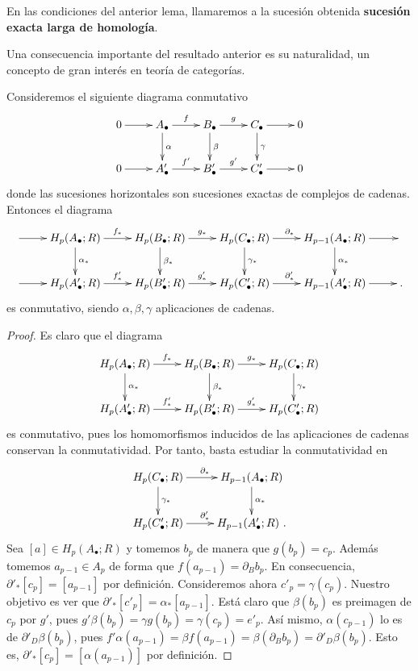 \begin{definicion}
	En las condiciones del anterior lema, llamaremos a la sucesión obtenida \textbf{sucesión exacta larga de homología}.
\end{definicion}
Una consecuencia importante del resultado anterior es su naturalidad, un concepto de gran interés en teoría de categorías.
\begin{teorema}
	Consideremos el siguiente diagrama conmutativo
	\[
	\xymatrix{
		0 \ar@{->}[r] & A_{\bullet} \ar@{->}[r]^{f} \ar@{->}[d]^{\alpha} & B_{\bullet} \ar@{->}[r]^{g} \ar@{->}[d]^{\beta} & C_{\bullet} \ar@{->}[r] \ar@{->}[d]^{\gamma} & 0 \\
		0 \ar@{->}[r] & A'_{\bullet} \ar@{->}[r]^{f'} & B'_{\bullet} \ar@{->}[r]^{g'} & C'_{\bullet} \ar@{->}[r] & 0
	}
	\]
	donde las sucesiones horizontales son sucesiones exactas de complejos de cadenas. Entonces el diagrama
	\[
	\xymatrix{
		{} \ar@{->}[r] & H_p(A_{\bullet};R) \ar@{->}[r]^{f_*} \ar@{->}[d]^{\alpha_*} & H_p(B_{\bullet};R) \ar@{->}[r]^{g_*} \ar@{->}[d]^{\beta_*} & H_p(C_{\bullet};R) \ar@{->}[r]^{\partial_*} \ar@{->}[d]^{\gamma_*} & H_{p-1}(A_{\bullet};R) \ar@{->}[r] \ar@{->}[d]^{\alpha_*} & {} \\
		{} \ar@{->}[r] & H_p(A'_{\bullet};R) \ar@{->}[r]^{f'_*} & H_p(B'_{\bullet};R) \ar@{->}[r]^{g'_*} & H_p(C'_{\bullet};R) \ar@{->}[r]^{\partial'_*} & H_{p-1}(A'_{\bullet};R) \ar@{->}[r] & .
	}
	\]
	es conmutativo, siendo $\alpha, \beta, \gamma$ aplicaciones de cadenas.
\end{teorema}
\begin{proof}
	Es claro que el diagrama
	\[
	\xymatrix{
		H_p(A_{\bullet};R) \ar@{->}[r]^{f_*} \ar@{->}[d]^{\alpha_*} & H_p(B_{\bullet};R) \ar@{->}[r]^{g_*} \ar@{->}[d]^{\beta_*} & H_p(C_{\bullet};R) \ar@{->}[d]^{\gamma_*} \\
		H_p(A'_{\bullet};R) \ar@{->}[r]^{f'_*} & H_p(B'_{\bullet};R) \ar@{->}[r]^{g'_*} & H_p(C'_{\bullet};R)
	}
	\]
	es conmutativo, pues los homomorfismos inducidos de las aplicaciones de cadenas conservan la conmutatividad. Por tanto, basta estudiar la conmutatividad en
	\[
	\xymatrix{
		H_p(C_{\bullet};R) \ar@{->}[r]^{\partial_*} \ar@{->}[d]^{\gamma_*} & H_{p-1}(A_{\bullet};R) \ar@{->}[d]^{\alpha_*} \\
		H_p(C'_{\bullet};R) \ar@{->}[r]^{\partial'_*} & H_{p-1}(A'_{\bullet};R)\ .
	}
	\]
	Sea $[a] \in H_p(A_{\bullet};R)$ y tomemos $b_p$ de manera que $g(b_p)=c_p$. Además tomemos $a_{p-1} \in A_p$ de forma que $f(a_{p-1}) = \partial_B b_p$. En consecuencia, $\partial'_*[c_p] = [a_{p-1}]$ por definición. Consideremos ahora $c'_p = \gamma(c_p)$. Nuestro objetivo es ver que $\partial'_*[c'_p] = \alpha_*[a_{p-1}]$. Está claro que $\beta(b_p)$ es preimagen de $c_p$ por $g'$, pues $g'\beta(b_p) = \gamma g(b_p) = \gamma(c_p) = e'_p$. Así mismo, $\alpha(c_{p-1})$ lo es de $\partial'_D \beta(b_p)$, pues $f'\alpha(a_{p-1}) = \beta f (a_{p-1}) = \beta(\partial_B b_p) = \partial'_D \beta(b_p)$. Esto es, $\partial'_*[c_p] = [\alpha(a_{p-1})]$ por definición.
\end{proof}
